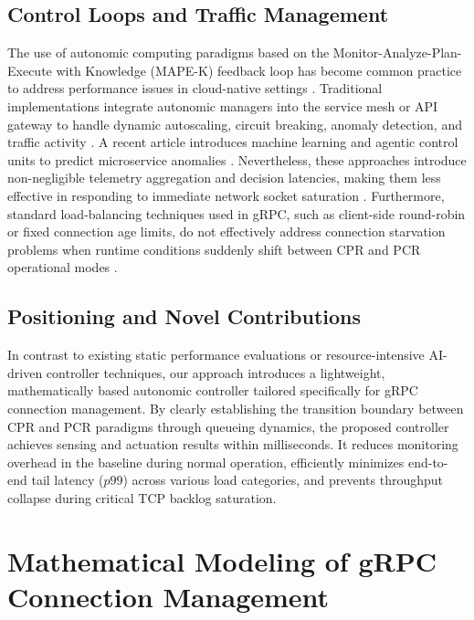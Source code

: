 \documentclass{ieeeaccess}
\begin{document}
\subsection{Control Loops and Traffic Management}
The use of autonomic computing paradigms based on the Monitor-Analyze-Plan-Execute with Knowledge (MAPE-K) feedback loop has become common practice to address performance issues in cloud-native settings \cite{armstrong2017towards}. Traditional implementations integrate autonomic managers into the service mesh or API gateway to handle dynamic autoscaling, circuit breaking, anomaly detection, and traffic activity \cite{carnevali2025compositional}. A recent article introduces machine learning and agentic control units to predict microservice anomalies \cite{toka2021machine}. Nevertheless, these approaches introduce non-negligible telemetry aggregation and decision latencies, making them less effective in responding to immediate network socket saturation \cite{qiu2020firm}. Furthermore, standard load-balancing techniques used in gRPC, such as client-side round-robin or fixed connection age limits, do not effectively address connection starvation problems when runtime conditions suddenly shift between CPR and PCR operational modes \cite{dautov2014utilising}.

\subsection{Positioning and Novel Contributions}
In contrast to existing static performance evaluations or resource-intensive AI-driven controller techniques, our approach introduces a lightweight, mathematically based autonomic controller tailored specifically for gRPC connection management. By clearly establishing the transition boundary between CPR and PCR paradigms through queueing dynamics, the proposed controller achieves sensing and actuation results within milliseconds. It reduces monitoring overhead in the baseline during normal operation, efficiently minimizes end-to-end tail latency ($p99$) across various load categories, and prevents throughput collapse during critical TCP backlog saturation.


\section{Mathematical Modeling of gRPC Connection Management}
\label{sec:math-model}
\end{document}
